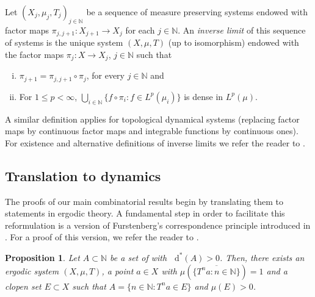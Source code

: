 \documentclass[letter, 11pt]{article}
\newtheorem{prop}[theo]{Proposition}
\theoremstyle{definition}
\theoremstyle{plain}
\newcommand{\N}{\mathbb{N}}
\newcommand*\diff{\mathop{}\!\mathrm{d}}
\newcommand{\1}{\mathbbm{1}}
\begin{document}
Let $(X_j,\mu_j,T_j)_{j\in \N}$ be a sequence of measure preserving systems endowed with factor maps $\pi_{j,j+1}: X_{j+1}\to X_j$ for each $j\in \N$. An \emph{inverse limit} of this sequence of systems is the unique system $(X,\mu,T)$ (up to isomorphism) endowed with the factor maps $\pi_j:X\to X_j$, $j\in \N$ such that
\begin{enumerate}[(i)]
    \item \label{point inverse 1}  $\pi_{j+1}=\pi_{j,j+1} \circ \pi_j$, for every $j\in \N$ and 
    \item For $1\leq p <\infty$, $\bigcup_{i\in \N} \{f \circ \pi_i : f\in L^p(\mu_i)\}$ is dense in $L^p(\mu)$.
\end{enumerate}
A similar definition applies for topological dynamical systems (replacing factor maps by continuous factor maps and integrable functions by continuous ones). For existence and alternative definitions of inverse limits we refer the reader to \cite[Chapter 6.2]{Host_Kra_nilpotent_structures_ergodic_theory:2018}. 


\subsection{Translation to dynamics}\label{translation to dynamics and some reductions}

The proofs of our main combinatorial 
results 
begin by translating them to statements in ergodic theory. A fundamental step in order to facilitate 
this reformulation is a version of  Furstenberg's correspondence 
principle introduced in \cite{Furstenberg77}. 
For a proof of this version, we refer the reader to 
\cite{Kra_Moreira_Richter_Robertson:2022}.

\begin{prop}\label{FCP}
Let $A\subset \N$ be a set of with $\diff^*(A)>0$. Then, there 
exists an ergodic system $(X,\mu,T)$, a point $a\in X$ with 
$\mu\left(\overline{\{T^na: n\in \N\}}\right)=1$ and a clopen set 
$E\subset X$ such that $A=\{n\in \N: T^na\in E\}$ and $\mu(E)>0$.
\end{prop}
\end{document}
